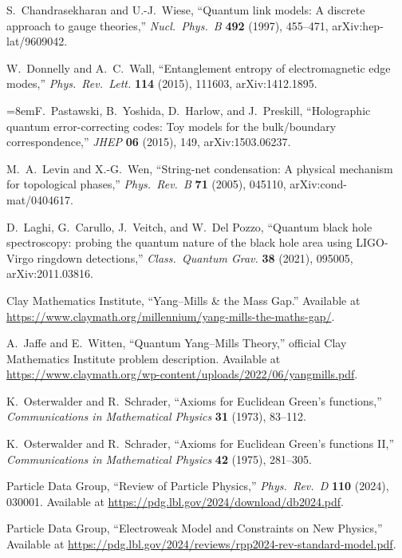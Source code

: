 S.~Chandrasekharan and U.-J.~Wiese,
``Quantum link models: A discrete approach to gauge theories,''
\emph{Nucl.\ Phys.\ B} \textbf{492} (1997), 455--471,
arXiv:hep-lat/9609042.

W.~Donnelly and A.~C.~Wall,
``Entanglement entropy of electromagnetic edge modes,''
\emph{Phys.\ Rev.\ Lett.} \textbf{114} (2015), 111603,
arXiv:1412.1895.

{\emergencystretch=8em\relax F.~Pastawski, B.~Yoshida, D.~Harlow, and J.~Preskill,
``Holographic quantum error-correcting codes: Toy models for the bulk/boundary correspondence,''
\emph{JHEP} \textbf{06} (2015), 149,
arXiv:1503.06237.\par}

M.~A.~Levin and X.-G.~Wen,
``String-net condensation: A physical mechanism for topological phases,''
\emph{Phys.\ Rev.\ B} \textbf{71} (2005), 045110,
arXiv:cond-mat/0404617.

D.~Laghi, G.~Carullo, J.~Veitch, and W.~Del Pozzo,
``Quantum black hole spectroscopy: probing the quantum nature of the black hole area using LIGO-Virgo ringdown detections,''
\emph{Class.\ Quantum Grav.} \textbf{38} (2021), 095005,
arXiv:2011.03816.

Clay Mathematics Institute,
``Yang--Mills \& the Mass Gap.''
Available at \url{https://www.claymath.org/millennium/yang-mills-the-maths-gap/}.

A.~Jaffe and E.~Witten,
``Quantum Yang--Mills Theory,''
official Clay Mathematics Institute problem description.
Available at \url{https://www.claymath.org/wp-content/uploads/2022/06/yangmills.pdf}.

K.~Osterwalder and R.~Schrader,
``Axioms for Euclidean Green's functions,''
\emph{Communications in Mathematical Physics} \textbf{31} (1973), 83--112.

K.~Osterwalder and R.~Schrader,
``Axioms for Euclidean Green's functions II,''
\emph{Communications in Mathematical Physics} \textbf{42} (1975), 281--305.

Particle Data Group,
``Review of Particle Physics,''
\emph{Phys.\ Rev.\ D} \textbf{110} (2024), 030001.
Available at \url{https://pdg.lbl.gov/2024/download/db2024.pdf}.

Particle Data Group,
``Electroweak Model and Constraints on New Physics,''
Available at \url{https://pdg.lbl.gov/2024/reviews/rpp2024-rev-standard-model.pdf}.
